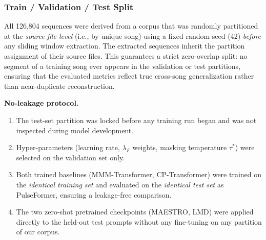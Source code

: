 \documentclass[pdflatex,sn-mathphys-num,twocolumn]{sn-jnl}
\theoremstyle{thmstyleone}
\theoremstyle{thmstyletwo}
\begin{document}
\subsubsection*{Train / Validation / Test Split}

All 126,804 sequences were derived from a corpus that was randomly partitioned at the \emph{source file level} (i.e., by unique song) using a fixed random seed (42) \emph{before} any sliding window extraction. The extracted sequences inherit the partition assignment of their source files. This guarantees a strict zero-overlap split: no segment of a training song ever appears in the validation or test partitions, ensuring that the evaluated metrics reflect true cross-song generalization rather than near-duplicate reconstruction.

\begin{tableorg}[ht]
\centering\small
\caption{Dataset partition summary. All models and all baselines were
  evaluated exclusively on the held-out test set.
  No hyper-parameter selection or early stopping used test-set labels.}
\label{tab:split}
\end{tableorg}

\noindent\textbf{No-leakage protocol.}
\begin{enumerate}[nosep,leftmargin=*]
  \item The test-set partition was locked before any training run began
        and was not inspected during model development.
  \item Hyper-parameters (learning rate, $\lambda_F$ weights, masking
        temperature $\tau^*$) were selected on the validation set only.
  \item Both trained baselines (MMM-Transformer, CP-Transformer) were
        trained on the \emph{identical training set} and evaluated on the
        \emph{identical test set} as PulseFormer, ensuring a leakage-free
        comparison.
  \item The two zero-shot pretrained checkpoints (MAESTRO, LMD) were
        applied directly to the held-out test prompts without any fine-tuning
        on any partition of our corpus.
\end{enumerate}
\end{document}

